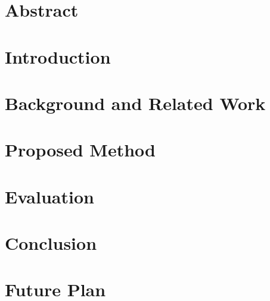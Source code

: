 \documentclass[11pt,a4paper]{report}\usepackage[]{graphicx}\usepackage[]{color}
\begin{document}
\listoffigures
\thispagestyle{empty}
\pagebreak



\chapter*{\centering Abstract}
\thispagestyle{empty}
\pagebreak






\chapter{Introduction}
% 
\pagebreak



\chapter{Background and Related Work}
\pagebreak



\chapter{Proposed Method}
\pagebreak



\chapter{Evaluation}
\pagebreak



\chapter{Conclusion}
\pagebreak



\chapter{Future Plan}
\pagebreak



 

\end{document}

